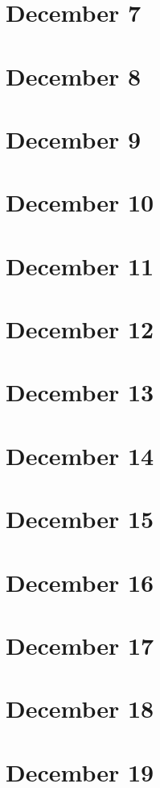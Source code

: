 \section{December 7}

\section{December 8}

\section{December 9}

\section{December 10}

\section{December 11}

\section{December 12}

\section{December 13}

\section{December 14}

\section{December 15}

\section{December 16}

\section{December 17}

\section{December 18}

\section{December 19}


